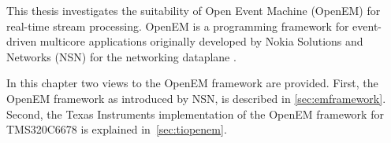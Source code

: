 This thesis investigates the suitability of Open Event Machine (OpenEM) for real-time stream processing. OpenEM is a programming framework for event-driven multicore applications originally developed by Nokia Solutions and Networks (NSN) for the networking dataplane \cite{openemintro}. 

In this chapter two views to the OpenEM framework are provided. First, the OpenEM framework as introduced by NSN, is described in \ref{sec:emframework}. Second, the Texas Instruments implementation of the OpenEM framework for TMS320C6678 is explained in~\ref{sec:tiopenem}.
